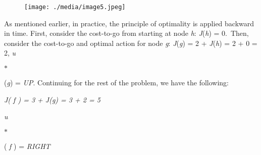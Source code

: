 \documentclass[12pt,twoside]{article}
\begin{document}
\vspace{\baselineskip}

\vspace{\baselineskip}



\begin{figure}[H]
\advance\leftskip 1.22in		\texttt{[image: ./media/image5.jpeg]}
\end{figure}



{\fontsize{10pt}{12.0pt}\selectfont \par}\par


\vspace{\baselineskip}

\vspace{\baselineskip}
\begin{adjustwidth}{0.08in}{0.58in}
As mentioned earlier, in practice, the principle of optimality is applied backward in time. First, consider the cost-to-go from starting at node \textit{h}: \textit{J}(\textit{h}) = 0.\ Then, consider the cost-to-go and optimal action for  node \textit{g}: \textit{J}(\textit{g}) = 2 + \textit{J}(\textit{h}) = 2 + 0 = 2, \textit{u}{\fontsize{7pt}{8.4pt}\selectfont $\ast$  \par}(\textit{g}) = \textit{UP}. Continuing for the rest of the problem, we have the following:\par

\end{adjustwidth}


\vspace{\baselineskip}

\vspace{\baselineskip}

\vspace{\baselineskip}

\vspace{\baselineskip}
\begin{adjustwidth}{0.51in}{1.09in}
{\fontsize{10pt}{12.0pt}\selectfont \textit{J( f ) = 3 + J(g) = 3 + 2 = 5}\par}\par

\end{adjustwidth}

\begin{adjustwidth}{2.35in}{0.0in}
\begin{FlushLeft}
{\fontsize{10pt}{12.0pt}\selectfont \textit{u}{\fontsize{7pt}{8.4pt}\selectfont $\ast$  {\fontsize{10pt}{12.0pt}\selectfont ( \textit{f }) = \textit{RIGHT}\par}\par}\par}
\end{FlushLeft}\par

\end{adjustwidth}
\end{document}
